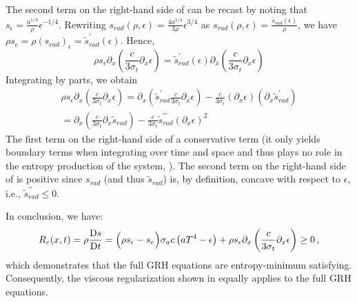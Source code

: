 \documentclass[times,doublespace]{fldauth}%
\begin{document}
The second term on the right-hand side of  can be recast by noting that $s_\epsilon = 
\frac{a^{1/4}}{\rho} \epsilon^{-1/4}$. Rewriting $s_{rad}(\rho, \epsilon) = \frac{4a^{1/4}}{3\rho} \epsilon^{3/4}$ 
as  $s_{rad}(\rho, \epsilon) = \frac{\tilde{s}_{rad}(\epsilon)}{\rho}$, we have
$ \rho s_\epsilon = \rho (s_{rad})_\epsilon = \tilde{s}^\prime_{rad}(\epsilon)$. Hence, 
\begin{equation}
\rho s_\epsilon \partial_x \left( \frac{c}{3 \sigma_t} \partial_x \epsilon \right) 
=
 \tilde{s}^\prime_{rad}(\epsilon) \partial_x \left( \frac{c}{3 \sigma_t} \partial_x \epsilon \right) 
\end{equation}
%
Integrating by parts, we obtain
%
\begin{multline} \label{eq:final_form_second_term}
\rho s_\epsilon \partial_x \left( \frac{c}{3 \sigma_t} \partial_x \epsilon \right) 
=
 \partial_x \left(  \tilde{s}^\prime_{rad}  \frac{c}{3 \sigma_t} \partial_x \epsilon \right) 
-
\frac{c}{3 \sigma_t} \left(  \partial_x \epsilon \right)  \left( \partial_x \tilde{s}^\prime_{rad}  \right) \\
=
 \partial_x \left(   \frac{c}{3 \sigma_t} \partial_x \tilde{s}_{rad}  \right) 
-
\frac{c}{3 \sigma_t} \tilde{s}^{\prime\prime}_{rad}  \left(  \partial_x \epsilon \right)^2   \qquad  \qquad  \qquad \ 
\end{multline}
%
The first term on the right-hand side of  a conservative term (it only yields boundary 
terms when integrating over time and space and thus plays no role in the entropy production of the system, 
\cite{Leveque}). The second term on the right-hand side of \eqt{eq:final_form_second_term} is positive 
since $s_{rad}$ (and thus $\tilde{s}_{rad}$) is, by definition, concave with respect to $\epsilon$, i.e., $\tilde{s}^{\prime\prime}_{rad} \leq 0$.

In conclusion, we have: 
\begin{equation} 
R_e(x,t) = \rho \frac{\textrm{D} s}{\textrm{D} t} = \Big( \rho s_\epsilon -s_e \Big)  \sigma_a c \left( a T^4 - \epsilon \right) +   \rho s_\epsilon \partial_x \left( \frac{c}{3 \sigma_t} \partial_x \epsilon \right) \geq 0 \,,
\end{equation}
which demonstrates that the full GRH equations are entropy-minimum satisfying. Consequently, the viscous regularization shown in  equally applies to the full GRH equations. 
%
\end{document}
